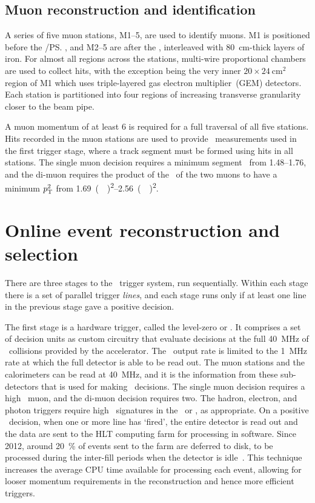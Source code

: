 \subsection{Muon reconstruction and identification}
\label{chap:intro:lhcb:muon}

A series of five muon stations, M1--5, are used to identify muons.
M1 is positioned before the \spd/\ps, and M2--5 are after the \hcal, 
interleaved with \SI{80}{\centi\metre}-thick layers of iron.
For almost all regions across the stations, multi-wire proportional chambers 
are used to collect hits, with the exception being the very inner 
$20\times\SI{24}{\centi\metre\squared}$ region of M1 which uses triple-layered 
gas electron multiplier~(GEM) detectors.
Each station is partitioned into four regions of increasing transverse 
granularity closer to the beam pipe.

A muon momentum of at least \SI{6}{\GeVc} is required for a full traversal of 
all five stations.
Hits recorded in the muon stations are used to provide \pT\ measurements used 
in the first trigger stage, where a track segment must be formed using hits in 
all stations.
The single muon decision requires a minimum segment \pT\ from 
\SIrange{1.48}{1.76}{\GeVc}, and the di-muon requires the product of the \pT\ 
of the two muons to have a minimum $p_{\textnormal{T}}^{2}$ from 
\SIrange{1.69}{2.56}{(\GeVc)\squared}.

\section{Online event reconstruction and selection}
\label{chap:intro:lhcb:trigger}

There are three stages to the \lhcb\ trigger system, run sequentially.
Within each stage there is a set of parallel trigger \emph{lines}, and each 
stage runs only if at least one line in the previous stage gave a positive 
decision.

The first stage is a hardware trigger, called the level-zero or \lzero.
It comprises a set of decision units as custom circuitry that evaluate 
decisions at the full \SI{40}{\mega\hertz} of \pp\ collisions provided by the 
accelerator.
The \lzero\ output rate is limited to the \SI{1}{\mega\hertz} rate at which the 
full detector is able to be read out.
The muon stations and the calorimeters can be read at \SI{40}{\mega\hertz}, and 
it is the information from these sub-detectors that is used for making \lzero\ 
decisions.
The single muon decision requires a high \pT\ muon, and the di-muon decision 
requires two.
The hadron, electron, and photon triggers require high \ET\ signatures in the 
\hcal\ or \ecal, as appropriate.
On a positive \lzero\ decision, when one or more line has `fired', the entire 
detector is read out and the data are sent to the \ac{HLT} computing farm for 
processing in software.
Since 2012, around \SI{20}{\percent} of events sent to the farm are deferred to 
disk, to be processed during the inter-fill periods when the detector is 
idle~\cite{1742-6596-513-1-012006}.
This technique increases the average CPU time available for processing each 
event, allowing for looser momentum requirements in the reconstruction and 
hence more efficient triggers.


